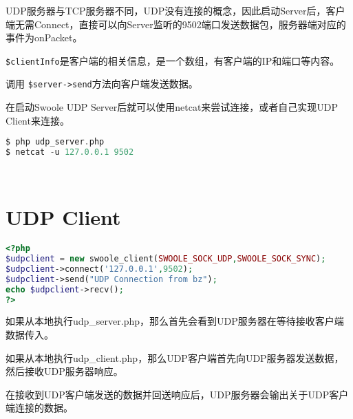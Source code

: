 UDP服务器与TCP服务器不同，UDP没有连接的概念，因此启动Server后，客户端无需Connect，直接可以向Server监听的9502端口发送数据包，服务器端对应的事件为onPacket。

\begin{compactitem}
\item \texttt{\$clientInfo}是客户端的相关信息，是一个数组，有客户端的IP和端口等内容。
\item 调用 \texttt{\$server->send}方法向客户端发送数据。
\end{compactitem}


在启动Swoole UDP Server后就可以使用netcat来尝试连接，或者自己实现UDP Client来连接。

\begin{lstlisting}[language=PHP]
$ php udp_server.php
$ netcat -u 127.0.0.1 9502
\end{lstlisting}




\begin{lstlisting}[language=PHP]

\end{lstlisting}






\begin{lstlisting}[language=PHP]

\end{lstlisting}


\section{UDP Client}


\begin{lstlisting}[language=PHP]
 <?php
$udpclient = new swoole_client(SWOOLE_SOCK_UDP,SWOOLE_SOCK_SYNC);
$udpclient->connect('127.0.0.1',9502);
$udpclient->send("UDP Connection from bz");
echo $udpclient->recv();
?>
\end{lstlisting}

\begin{compactitem}
\item 如果从本地执行udp\_server.php，那么首先会看到UDP服务器在等待接收客户端数据传入。
\item 如果从本地执行udp\_client.php，那么UDP客户端首先向UDP服务器发送数据，然后接收UDP服务器响应。
\item 在接收到UDP客户端发送的数据并回送响应后，UDP服务器会输出关于UDP客户端连接的数据。
\end{compactitem}



